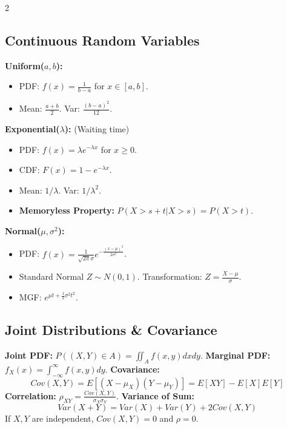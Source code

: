 \documentclass[10pt, letterpaper]{article}
\begin{document}
\begin{multicols*}{2}
\subsection{Continuous Random Variables}
\textbf{Uniform($a, b$):}
\begin{itemize}
    \item PDF: $f(x) = \frac{1}{b-a}$ for $x \in [a, b]$.
    \item Mean: $\frac{a+b}{2}$. Var: $\frac{(b-a)^2}{12}$.
\end{itemize}

\textbf{Exponential($\lambda$):} (Waiting time)
\begin{itemize}
    \item PDF: $f(x) = \lambda e^{-\lambda x}$ for $x \ge 0$.
    \item CDF: $F(x) = 1 - e^{-\lambda x}$.
    \item Mean: $1/\lambda$. Var: $1/\lambda^2$.
    \item \textbf{Memoryless Property:} $P(X > s+t | X > s) = P(X > t)$.
\end{itemize}

\textbf{Normal($\mu, \sigma^2$):}
\begin{itemize}
    \item PDF: $f(x) = \frac{1}{\sqrt{2\pi}\sigma} e^{-\frac{(x-\mu)^2}{2\sigma^2}}$.
    \item Standard Normal $Z \sim N(0,1)$. Transformation: $Z = \frac{X-\mu}{\sigma}$.
    \item MGF: $e^{\mu t + \frac{1}{2}\sigma^2 t^2}$.
\end{itemize}

\subsection{Joint Distributions \& Covariance}
\textbf{Joint PDF:} $P((X,Y) \in A) = \iint_A f(x,y) dx dy$.
\textbf{Marginal PDF:} $f_X(x) = \int_{-\infty}^{\infty} f(x,y) dy$.
\textbf{Covariance:}
$$ Cov(X,Y) = E[(X-\mu_X)(Y-\mu_Y)] = E[XY] - E[X]E[Y] $$
\textbf{Correlation:} $\rho_{XY} = \frac{Cov(X,Y)}{\sigma_X \sigma_Y}$.
\textbf{Variance of Sum:}
$$ Var(X+Y) = Var(X) + Var(Y) + 2Cov(X,Y) $$
If $X, Y$ are independent, $Cov(X,Y)=0$ and $\rho=0$.


\end{multicols*}
\end{document}
